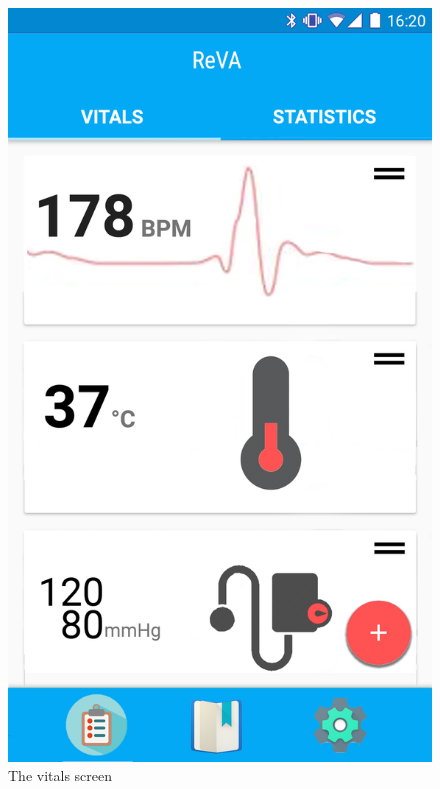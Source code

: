 \begin{figure}
\centering
\begin{minipage}{.5\textwidth}
  \centering
  \includegraphics[width=0.9\linewidth]{../images/UI/Vitals.png}
  \caption{\label{fig:vitals}The vitals screen}


\end{minipage}
\end{figure}
